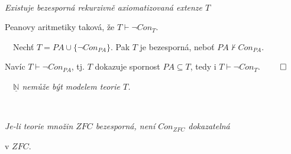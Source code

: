     \ \ {\it Existuje bezesporná rekurzivně axiomatizovaná extenze $T$
    \smallskip
    
    Peanovy aritmetiky taková, že $T\vdash \neg Con_T$.}
    \medskip
    
    \smallskip
    
    \ \ Nechť $T=PA \cup \{\neg Con_{PA}\}$. Pak $T$ je bezesporná, neboť $PA \not \vdash Con_{PA}$.
    \smallskip
    
    Navíc $T \vdash \neg Con_{PA}$, tj. $T$ dokazuje spornost $PA\subseteq T$, tedy i $T\vdash \neg Con_T$. $\qed$
    
    \medskip
    {\it {}\ \ $\underline{\mathbb{N}}$ nemůže být modelem teorie $T$.}
    
    \bigskip
    
    \ \ {\it Je-li teorie množin $ZFC$ bezesporná, není $Con_{ZFC}$ dokazatelná
    \smallskip
    
    v $ZFC$.}
    



